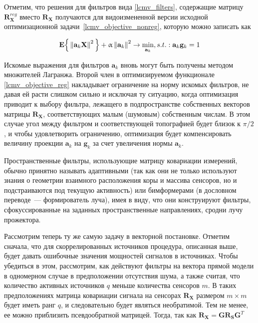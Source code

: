 Отметим, что решения для фильтров вида \ref{lcmv_filters},
содержащие матрицу $\mathbf{R}_\mathbf{X}^{reg}$ вместо $\mathbf{R}_\mathbf{X}$ получаются для
видоизмененной версии исходной оптимизационной задачи~\ref{lcmv_objective_nonreg},
которую можно записать как

\begin{equation}
    \mathbf{E}\Big\{\left\lVert\mathbf{a}_k \mathbf{X}\right\rVert^2\Big\} + \upalpha \left\lVert\mathbf{a}_k\right\rVert^2
    \rightarrow \underset{\mathbf{a}_k}{\min},
    s.t.: \mathbf{a}_k \mathbf{g}_k = 1
    \label{lcmv_objective_reg}
\end{equation}

Искомые выражения для фильтров $\mathbf{a}_k$ вновь могут быть получены методом множителей Лагранжа.
Второй член в оптимизируемом функционале \ref{lcmv_objective_reg} накладывает ограничение на
норму искомых фильтров, не давая ей расти слишком сильно и исключая ту ситуацию,
когда оптимизация приводит к выбору фильтра, лежащего в подпространстве собственных
векторов матрицы $\mathbf{R}_\mathbf{X}$, соответствующих малым (шумовым) собственным числам.
В этом случае угол между фильтром и соответствующей топографией будет близок к $\pi/2$,
и чтобы удовлетворить ограничению, оптимизация будет компенсировать величину проекции
$\mathbf{a}_k$ на $\mathbf{g}_k$ за счет увеличения нормы $\mathbf{a}_k$.

Пространственные фильтры, использующие матрицу ковариации измерений,
обычно принятно называть адаптивными
(так как они не только используют знания о геометрии взаимного расположения коры и массива сенсоров,
но и подстраиваются под текущую активность) или
бимформерами (в дословном переводе~--- формирователь луча),
имея в виду, что они конструируют фильтры,
сфокуссированные на заданных пространственные направлениях, сродни лучу прожектора.

Рассмотрим теперь ту же самую задачу в векторной постановке.
Отметим сначала, что для скоррелированных источников процедура, описанная
выше, будет давать ошибочные значения мощностей сигналов в источниках.
Чтобы убедиться в этом, рассмотрим, как действуют фильтры на вектора прямой модели
в одномерном случае в предположении отсутствия шума,
а также считая, что количество активных источников $q$ меньше количества сенсоров $m$.
В таких предположениях матрица ковариации сигнала на сенсорах $\mathbf{R}_{\mathbf{X}}$
размером $m\times m$ будет иметь ранг $q$, и следовательно будет являться необратимой.
Тем не менее, ее можно приблизить псевдообратной матрицей.
Тогда, так как $\mathbf{R}_\mathbf{X} = \mathbf{G} \mathbf{R}_\mathbf{S} \mathbf{G}^T$

